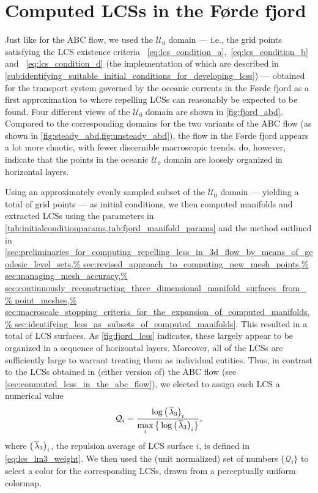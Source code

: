 \section{Computed LCSs in the Førde fjord}
\label{sec:computed_lcss_in_the_forde_fjord}

Just like for the ABC flow, we used the $\mathcal{U}_{0}$ domain --- i.e.,
the grid points satisfying the LCS existence criteria~
\eqref{eq:lcs_condition_a},~\eqref{eq:lcs_condition_b} and~
\eqref{eq:lcs_condition_d} (the implementation of which are described in
\cref{sub:identifying_suitable_initial_conditions_for_developing_lcss}) ---
obtained for the transport system governed by the oceanic currents in the
Førde fjord as a first approximation to where repelling LCSs can reasonably
be expected to be found. Four different views of the $\mathcal{U}_{0}$ domain
are shown in \cref{fig:fjord_abd}. Compared to the corresponding domains
for the two variants of the ABC flow (as shown in
\cref{fig:steady_abd,fig:unsteady_abd}), the flow in the Førde fjord appears
a lot more chaotic, with fewer discernible macroscopic trends.
 do, however, indicate that the
points in the oceanic $\mathcal{U}_{0}$ domain are loosely organized
in horizontal layers.



Using an approximately evenly sampled subset of the $\mathcal{U}_{0}$ domain
--- yielding a total of  grid points --- as initial conditions,
we then computed manifolds and extracted LCSs using the parameters
in \cref{tab:initialconditionparams,tab:fjord_manifold_params} and the method
outlined in \cref{sec:preliminaries_for_computing_repelling_lcss_in_3d_flow_by_means_of_geodesic_level_sets,%
    sec:revised_approach_to_computing_new_mesh_points,%
    sec:managing_mesh_accuracy,%
    sec:continuously_reconstructing_three_dimensional_manifold_surfaces_from_%
    point_meshes,%
    sec:macroscale_stopping_criteria_for_the_expansion_of_computed_manifolds,%
    sec:identifying_lcss_as_subsets_of_computed_manifolds}. This resulted in
a total of  LCS surfaces. As \cref{fig:fjord_lcss} indicates,
these largely appear to be organized in a sequence of horizontal layers.
Moreover, all of the LCSs are sufficiently large to warrant treating them
as individual entities. Thus, in contrast to the LCSs obtained in (either
version of) the ABC flow (see \cref{sec:computed_lcss_in_the_abc_flow}), we
elected to assign each LCS a numerical value
\begin{equation}
    \label{eq:fjord_lcs_colorscaling}
    \mathcal{Q}_{i} = \frac{\log{{\big({\mkern2mu}\overline{\lambda}_{3}\big)}_{i}}}%
    {\max\limits_{i}\big\{\log{{\big({\mkern2mu}\overline{\lambda}_{3}\big)}_{i}}\big\}},
\end{equation}
where ${\big({\mkern2mu}\overline{\lambda}_{3}}\big)_{i}$, the repulsion average
of LCS surface $i$, is defined in \cref{eq:lcs_lm3_weight}. We then used the
(unit normalized) set of numbers $\big\{\mathcal{Q}_{i}\big\}$ to select a color
for the corresponding LCSs, drawn from a perceptually uniform colormap.

